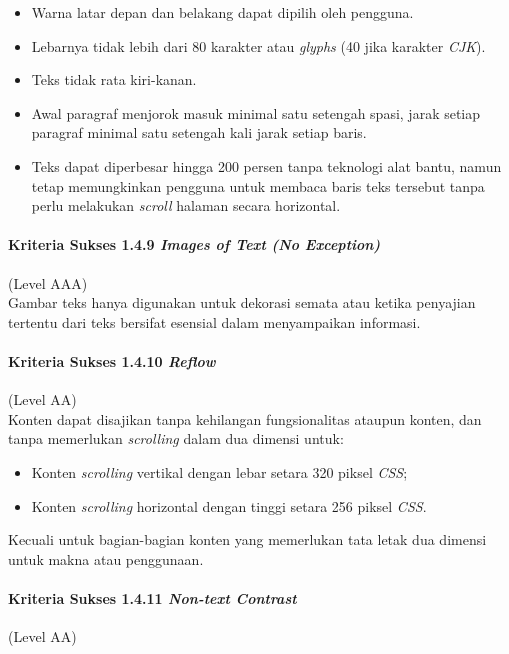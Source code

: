 \begin{itemize}
	\item Warna latar depan dan belakang dapat dipilih oleh pengguna.
	\item Lebarnya tidak lebih dari 80 karakter atau \textit{glyphs} (40 jika karakter \textit{CJK}).
	\item Teks tidak rata kiri-kanan.
	\item Awal paragraf menjorok masuk minimal satu setengah spasi, jarak setiap paragraf minimal satu setengah kali jarak setiap baris.
	\item Teks dapat diperbesar hingga 200 persen tanpa teknologi alat bantu, namun tetap memungkinkan pengguna untuk membaca baris teks tersebut tanpa perlu melakukan \textit{scroll} halaman secara horizontal.
\end{itemize}

\paragraph{Kriteria Sukses 1.4.9 \textit{Images of Text (No Exception)}}
\label{sec:kriteria_sukses_1.4.9}
(Level AAA)\\

Gambar teks hanya digunakan untuk dekorasi semata atau ketika penyajian tertentu dari teks bersifat esensial dalam menyampaikan informasi.

\paragraph{Kriteria Sukses 1.4.10 \textit{Reflow}}
\label{sec:kriteria_sukses_1.4.10}
(Level AA)\\

Konten dapat disajikan tanpa kehilangan fungsionalitas ataupun konten, dan tanpa memerlukan \textit{scrolling} dalam dua dimensi untuk:

\begin{itemize}
	\item Konten \textit{scrolling} vertikal dengan lebar setara 320 piksel \textit{CSS};
	\item Konten \textit{scrolling} horizontal dengan tinggi setara 256 piksel \textit{CSS}.
\end{itemize}

Kecuali untuk bagian-bagian konten yang memerlukan tata letak dua dimensi untuk makna atau penggunaan.

\paragraph{Kriteria Sukses 1.4.11 \textit{Non-text Contrast}}
\label{sec:kriteria_sukses_1.4.11}
(Level AA)\\

